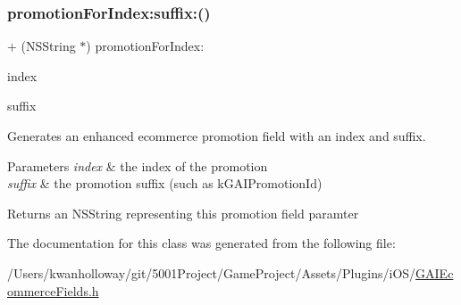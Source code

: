 \subsubsection{\texorpdfstring{promotion\+For\+Index\+:suffix\+:()}{promotionForIndex:suffix:()}}
{\footnotesize\ttfamily + (N\+S\+String $\ast$) promotion\+For\+Index\+: \begin{DoxyParamCaption}\item[{(N\+S\+U\+Integer)}]{index }\item[{suffix:(N\+S\+String $\ast$)}]{suffix }\end{DoxyParamCaption}}

Generates an enhanced ecommerce promotion field with an index and suffix.


\begin{DoxyParams}{Parameters}
{\em index} & the index of the promotion \\
\hline
{\em suffix} & the promotion suffix (such as k\+G\+A\+I\+Promotion\+Id)\\
\hline
\end{DoxyParams}
\begin{DoxyReturn}{Returns}
an N\+S\+String representing this promotion field paramter 
\end{DoxyReturn}


The documentation for this class was generated from the following file\+:\begin{DoxyCompactItemize}
\item 
/\+Users/kwanholloway/git/5001\+Project/\+Game\+Project/\+Assets/\+Plugins/i\+O\+S/\hyperlink{_g_a_i_ecommerce_fields_8h}{G\+A\+I\+Ecommerce\+Fields.\+h}\end{DoxyCompactItemize}
